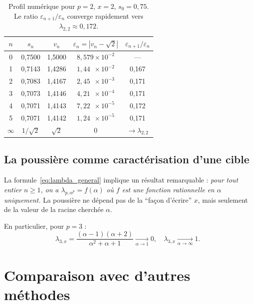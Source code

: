 \documentclass[11pt,a4paper]{article}
\theoremstyle{definition}
\newcommand{\eps}{\varepsilon}
\begin{document}
\begin{table}[h]
\centering
\begin{tabular}{ccccc}
\toprule
$n$ & $s_n$ & $v_n$ & $\eps_n = |v_n - \sqrt{2}|$ & $\eps_{n+1}/\eps_n$ \\
\midrule
0 & 0{,}7500 & 1{,}5000 & $8{,}579\times 10^{-2}$ & --- \\
1 & 0{,}7143 & 1{,}4286 & $1{,}44\phantom{0}\times 10^{-2}$ & 0{,}167 \\
2 & 0{,}7083 & 1{,}4167 & $2{,}45\phantom{0}\times 10^{-3}$ & 0{,}171 \\
3 & 0{,}7073 & 1{,}4146 & $4{,}21\phantom{0}\times 10^{-4}$ & 0{,}171 \\
4 & 0{,}7071 & 1{,}4143 & $7{,}22\phantom{0}\times 10^{-5}$ & 0{,}172 \\
5 & 0{,}7071 & 1{,}4142 & $1{,}24\phantom{0}\times 10^{-5}$ & 0{,}171 \\
$\infty$ & $1/\sqrt{2}$ & $\sqrt{2}$ & $0$ & $\to \lambda_{2,2}$ \\
\bottomrule
\end{tabular}
\caption{Profil numérique pour $p=2$, $x=2$, $s_0 = 0{,}75$. Le ratio $\eps_{n+1}/\eps_n$ converge rapidement vers $\lambda_{2,2} \approx 0{,}172$.}
\end{table}

\subsection{La poussière comme caractérisation d'une cible}

La formule~\eqref{eq:lambda_general} implique un résultat remarquable : \textit{pour tout entier $n \geq 1$, on a $\lambda_{p, \alpha^p} = f(\alpha)$ où $f$ est une fonction rationnelle en $\alpha$ uniquement.} La poussière ne dépend pas de la ``façon d'écrire'' $x$, mais seulement de la valeur de la racine cherchée $\alpha$.

En particulier, pour $p = 3$ :
\[
  \lambda_{3,x} = \frac{(\alpha-1)(\alpha+2)}{\alpha^2+\alpha+1} \xrightarrow[\alpha \to 1]{} 0, \quad
  \lambda_{3,x} \xrightarrow[\alpha \to \infty]{} 1.
\]

\section{Comparaison avec d'autres méthodes}
\label{sec:comparaisons}
\end{document}
